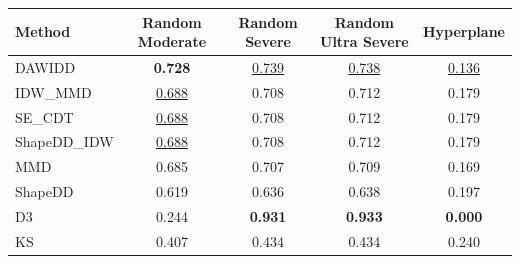 \begin{tabular}{|l|c|c|c|c|}
\hline
\textbf{Method} & \textbf{Random Moderate} & \textbf{Random Severe} & \textbf{Random Ultra Severe} & \textbf{Hyperplane} \\
\hline
DAWIDD & \textbf{0.728} & \underline{0.739} & \underline{0.738} & \underline{0.136} \\
IDW\_MMD & \underline{0.688} & 0.708 & 0.712 & 0.179 \\
SE\_CDT & \underline{0.688} & 0.708 & 0.712 & 0.179 \\
ShapeDD\_IDW & \underline{0.688} & 0.708 & 0.712 & 0.179 \\
MMD & 0.685 & 0.707 & 0.709 & 0.169 \\
ShapeDD & 0.619 & 0.636 & 0.638 & 0.197 \\
D3 & 0.244 & \textbf{0.931} & \textbf{0.933} & \textbf{0.000} \\
KS & 0.407 & 0.434 & 0.434 & 0.240 \\
\hline
\end{tabular}